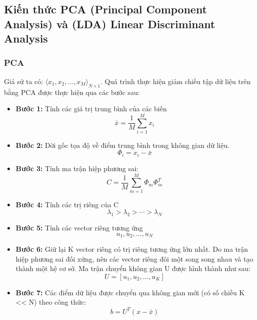 \subsection{Kiến thức PCA (Principal Component Analysis) và (LDA) Linear Discriminant Analysis }

\subsubsection{PCA}
Giả sử ta có: $\langle x_1, x_2, \ldots, x_M \rangle_{N \times 1}$. Quá trình thực hiện giảm chiều tập dữ liệu trên bằng PCA được thực hiện qua các bước sau:
\begin{itemize}
	\item \textbf{Bước 1: }Tính các giá trị trung bình của các biến
	\begin{equation}
		\bar{x} = \frac{1}{M}\sum_{i=1}^{M}{x_i}
	\end{equation}
	\item \textbf{Bước 2: }Dời gốc tọa độ về điểm trung bình trong không gian dữ liệu.
	\begin{equation}
		\Phi_i = x_i - \bar{x}
	\end{equation}
	\item \textbf{Bước 3: }Tính ma trận hiệp phương sai:
	\begin{equation}
		C = \frac{1}{M}\sum_{m=1}^{M}{\Phi_m \Phi_m^T}
	\end{equation}
	\item \textbf{Bước 4: }Tính các trị riêng của C
	\begin{equation}
		\lambda_1 > \lambda_2 > \cdots > \lambda_N
	\end{equation}
	\item \textbf{Bước 5: }Tính các vector riêng tương ứng
	\begin{equation}
		u_1, u_2,\ldots,u_N
	\end{equation}
	\item \textbf{Bước 6: }Giữ lại K vector riêng có trị riêng tương ứng lớn nhất. Do ma trận hiệp phương sai đối xứng, nên các vector riêng đôi một song song nhau và tạo thành một hệ cơ sở. Ma trận chuyển không gian U được hình thành như sau:
	\begin{equation}
		U = \left[u_1, u_2, \ldots, u_K\right]
	\end{equation}
	\item \textbf{Bước 7: }Các điểm dữ liệu được chuyển qua không gian mới (có số chiều K << N) theo công thức:
	\begin{equation}
		b = U^T\left(x - \bar{x}\right)
	\end{equation}
\end{itemize}
\pagebreak

